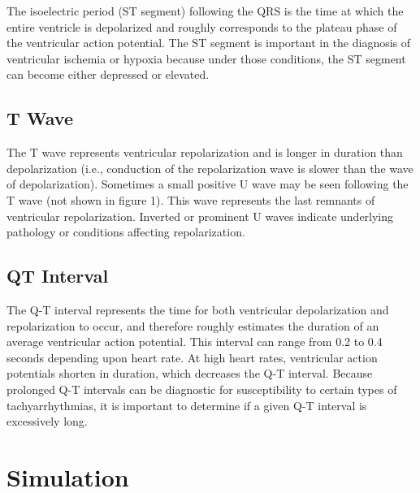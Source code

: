 \documentclass[
  11pt,
  letterpaper,
  DIV=11,
  numbers=noendperiod]{scrreprt}
\begin{document}
The isoelectric period (ST segment) following the QRS is the time at
which the entire ventricle is depolarized and roughly corresponds to the
plateau phase of the ventricular action potential. The ST segment is
important in the diagnosis of ventricular ischemia or hypoxia because
under those conditions, the ST segment can become either depressed or
elevated.

\subsection{T Wave}\label{t-wave}

The T wave represents ventricular repolarization and is longer in
duration than depolarization (i.e., conduction of the repolarization
wave is slower than the wave of depolarization). Sometimes a small
positive U wave may be seen following the T wave (not shown in figure
1). This wave represents the last remnants of ventricular
repolarization. Inverted or prominent U waves indicate underlying
pathology or conditions affecting repolarization.

\subsection{QT Interval}\label{qt-interval}

The Q-T interval represents the time for both ventricular depolarization
and repolarization to occur, and therefore roughly estimates the
duration of an average ventricular action potential. This interval can
range from 0.2 to 0.4 seconds depending upon heart rate. At high heart
rates, ventricular action potentials shorten in duration, which
decreases the Q-T interval. Because prolonged Q-T intervals can be
diagnostic for susceptibility to certain types of tachyarrhythmias, it
is important to determine if a given Q-T interval is excessively long.

\section{Simulation}\label{simulation}
\end{document}

